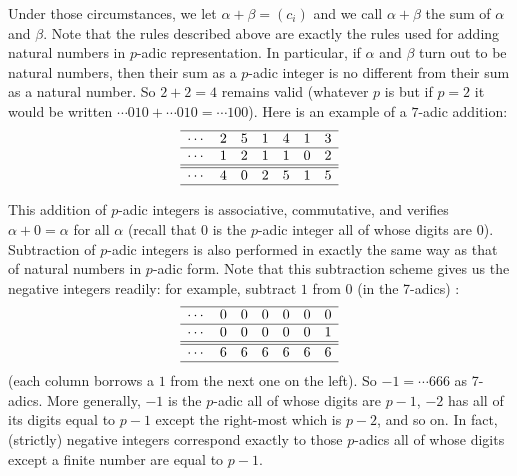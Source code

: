 \documentclass{llncs}
\begin{document}
Under those circumstances, we let $\alpha + \beta = (c_i)$ and we call $\alpha + \beta $ the sum of
$\alpha $ and $\beta $. Note that the rules described above are exactly the rules used for adding
natural numbers in $p$-adic representation. In particular, if $\alpha $ and $\beta $ turn out to be
natural numbers, then their sum as a $p$-adic integer is no different from their sum
as a natural number. So $2 + 2 = 4$ remains valid (whatever $p$ is  but if $p = 2$ it
would be written $\cdots  010 + \cdots  010 = \cdots 100$).
Here is an example of a $7$-adic addition:
$$
\begin{array}{rrrrrrrr|}
\hline
\cdots &2&5&1&4&1&3\\
\hline
\cdots & 1& 2 &1& 1 & 0& 2\\
\hline
\hline
\cdots &4& 0& 2& 5& 1 & 5 \\
\hline
\end{array}
$$


This addition of $p$-adic integers is associative, commutative, and verifies 
$\alpha + 0 = \alpha $ for all $\alpha $ (recall that $0$ is the $p$-adic integer all of whose digits are $0$).
Subtraction of $p$-adic integers is also performed in exactly the same way as
that of natural numbers in $p$-adic form. 
Note that this subtraction scheme gives us the negative integers readily: for
example, subtract $1$ from $0$ (in the 7-adics) :
$$
\begin{array}{rrrrrrrr|}
\hline
\cdots &0&0&0&0&0&0\\
\hline
\cdots & 0& 0 &0& 0 & 0& 1\\
\hline
\hline
\cdots &6& 6& 6& 6& 6 & 6 \\
\hline
\end{array}
$$
(each column borrows a $1$ from the next one on the left). So $ -1 = \cdots 666 $ as
7-adics. More generally, $-1$ is the $p$-adic all of whose digits are $p-1$, $-2$ has all
of its digits equal to $p-1$ except the right-most which is $p-2$, and so on. In fact,
(strictly) negative integers correspond exactly to those $p$-adics all of whose digits
except a finite number are equal to $p-1$.
\end{document}
